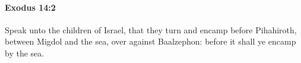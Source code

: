 
		\paragraph{Exodus 14:2} %
			\label{EXODUS-14-2}

			Speak unto the children of Israel, that they turn and encamp before Pihahiroth, between Migdol and the sea, over against Baalzephon: before it shall ye encamp by the sea.


